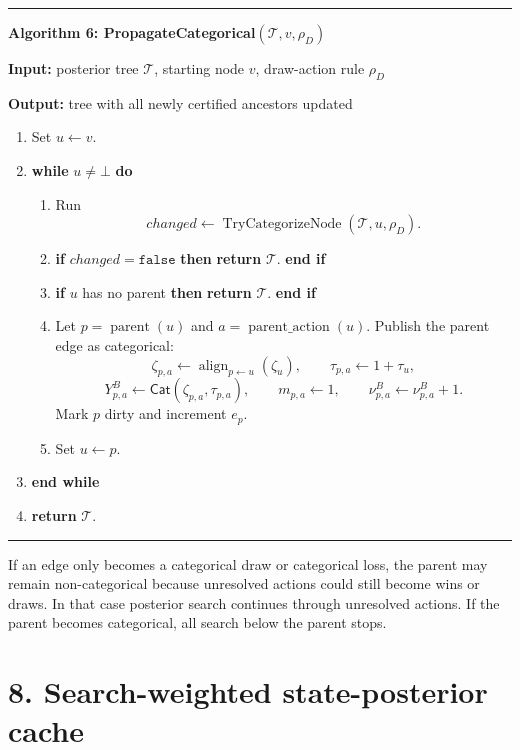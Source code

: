 \documentclass[11pt]{article}
\newcommand{\Tree}{\mathcal{T}}
\newcommand{\Align}{\operatorname{align}}
\newcommand{\CatObj}{\mathsf{Cat}}
\newcommand{\TryCategorizeNode}{\operatorname{TryCategorizeNode}}
\newenvironment{algorithmblock}[1]
{
  \par\medskip
  \noindent\hrule\par\smallskip
  \noindent\textbf{#1}
  \par\smallskip
}
{
  \par\smallskip\noindent\hrule\par\medskip
}
\newcommand{\Input}{\textbf{Input: }}
\newcommand{\Output}{\textbf{Output: }}
\newcommand{\Return}{\textbf{return }}
\newcommand{\If}{\textbf{if }}
\newcommand{\Then}{\textbf{ then }}
\newcommand{\EndIf}{\textbf{end if}}
\newcommand{\While}{\textbf{while }}
\newcommand{\EndWhile}{\textbf{end while}}
\newcommand{\Do}{\textbf{ do }}
\begin{document}
\begin{algorithmblock}{Algorithm 6: PropagateCategorical\((\Tree,v,\rho_D)\)}

\Input posterior tree \(\Tree\), starting node \(v\), draw-action rule \(\rho_D\)

\Output tree with all newly certified ancestors updated

\begin{enumerate}[leftmargin=2em]
  \item Set \(u\gets v\).

  \item \While \(u\ne\bot\) \Do
  \begin{enumerate}[leftmargin=2em]
    \item Run
    \[
    changed\gets\TryCategorizeNode(\Tree,u,\rho_D).
    \]

    \item \If \(changed=\texttt{false}\) \Then \Return \(\Tree\). \EndIf

    \item \If \(u\) has no parent \Then \Return \(\Tree\). \EndIf

    \item Let \(p=\operatorname{parent}(u)\) and
    \(a=\operatorname{parent\_action}(u)\). Publish the parent edge as
    categorical:
    \[
    \zeta_{p,a}\gets\Align_{p\leftarrow u}(\zeta_u),
    \qquad
    \tau_{p,a}\gets 1+\tau_u,
    \]
    \[
    Y^B_{p,a}\gets\CatObj(\zeta_{p,a},\tau_{p,a}),
    \qquad
    m_{p,a}\gets1,
    \qquad
    \nu^B_{p,a}\gets\nu^B_{p,a}+1.
    \]
    Mark \(p\) dirty and increment \(e_p\).

    \item Set \(u\gets p\).
  \end{enumerate}
  \item \EndWhile

  \item \Return \(\Tree\).
\end{enumerate}

\end{algorithmblock}

If an edge only becomes a categorical draw or categorical loss, the parent may
remain non-categorical because unresolved actions could still become wins or
draws. In that case posterior search continues through unresolved actions. If
the parent becomes categorical, all search below the parent stops.

\section*{8. Search-weighted state-posterior cache}
\end{document}
